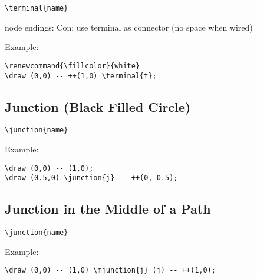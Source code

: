 \documentclass[parskip=full]{scrartcl}
\begin{document}
\begin{verbatim}
\terminal{name}
\end{verbatim}
node endings: Con: use terminal as connector (no space when wired)

Example:\\
\begin{minipage}{0.8\textwidth}
\begin{verbatim}
\renewcommand{\fillcolor}{white}
\draw (0,0) -- ++(1,0) \terminal{t};
\end{verbatim}
\end{minipage}
\begin{minipage}{0.19\textwidth}
\end{minipage}

\subsection{Junction (Black Filled Circle)}

\begin{verbatim}
\junction{name}
\end{verbatim}

Example:\\
\begin{minipage}{0.8\textwidth}
\begin{verbatim}
\draw (0,0) -- (1,0);
\draw (0.5,0) \junction{j} -- ++(0,-0.5);
\end{verbatim}
\end{minipage}
\begin{minipage}{0.19\textwidth}
\end{minipage}

\subsection{Junction in the Middle of a Path}

\begin{verbatim}
\junction{name}
\end{verbatim}

Example:\\
\begin{minipage}{0.8\textwidth}
\begin{verbatim}
\draw (0,0) -- (1,0) \mjunction{j} (j) -- ++(1,0);
\end{verbatim}
\end{minipage}
\begin{minipage}{0.19\textwidth}
\end{minipage}
\end{document}
